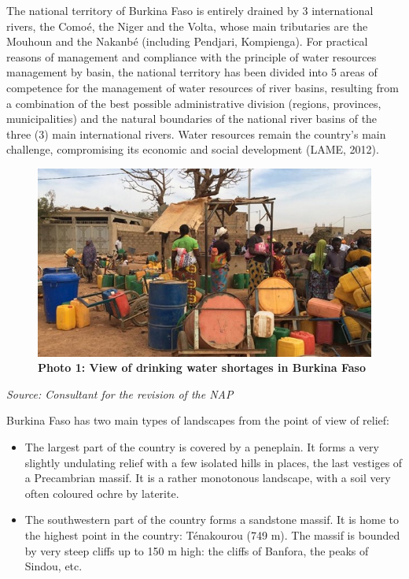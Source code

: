 \documentclass[
]{book}
\begin{document}
The national territory of Burkina Faso is entirely drained by 3 international rivers, the Comoé, the Niger and the Volta, whose main tributaries are the Mouhoun and the Nakanbé (including Pendjari, Kompienga). For practical reasons of management and compliance with the principle of water resources management by basin, the national territory has been divided into 5 areas of competence for the management of water resources of river basins, resulting from a combination of the best possible administrative division (regions, provinces, municipalities) and the natural boundaries of the national river basins of the three (3) main international rivers. Water resources remain the country's main challenge, compromising its economic and social development (LAME, 2012).

\begin{figure}
\centering
\includegraphics{Figures and Photos/Photo 1.png}
\caption{\textbf{Photo 1: View of drinking water shortages in Burkina Faso}}
\end{figure}

\emph{Source: Consultant for the revision of the NAP}

Burkina Faso has two main types of landscapes from the point of view of relief:

\begin{itemize}
\item
  The largest part of the country is covered by a peneplain. It forms a very slightly undulating relief with a few isolated hills in places, the last vestiges of a Precambrian massif. It is a rather monotonous landscape, with a soil very often coloured ochre by laterite.
\item
  The southwestern part of the country forms a sandstone massif. It is home to the highest point in the country: Ténakourou (749 m). The massif is bounded by very steep cliffs up to 150 m high: the cliffs of Banfora, the peaks of Sindou, etc.
\end{itemize}
\end{document}
